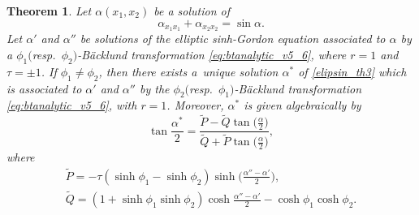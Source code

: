 \documentclass[pdftex]{sigma}
\numberwithin{equation}{section}
\newtheorem{Theorem}{Theorem}[section]
\begin{document}
\begin{Theorem}\label{th:super6}
Let $\alpha(x_1,x_2)$ be a solution of
\begin{equation}\label{elipsin_th3}
\alpha_{x_1x_1}+\alpha_{x_2x_2}=\sin \alpha.
\end{equation}
Let $\alpha'$ and $\alpha''$ be solutions of the elliptic sinh-Gordon
equation associated to $\alpha$ by a $\phi_1($resp.~$\phi_2)$-B\"acklund transformation \eqref{eq:btanalytic_v5_6}, where $r=1$ and $\tau=\pm 1$.
If $\phi_1\neq \phi_2$, then there exists a~unique solution $\alpha^*$ of \eqref{elipsin_th3} which is associated to
$\alpha'$ and $\alpha''$ by the $\phi_2($resp.\ $\phi_1)$-B\"acklund transformation \eqref{eq:btanalytic_v5_6}, with $r=1$. Moreover, $\alpha^*$ is
given algebraically by
\begin{equation}\label{eq:superpos_th3}
\tan \frac{\alpha^*}{2}= \frac{\tilde{P}-\tilde{Q} {\tan \bigl(\frac{\alpha}{2}\bigr) } }{\tilde{Q}+\tilde{P} {\tan\bigl(\frac{\alpha}{2}\bigr)} },
\end{equation}
where
\begin{gather}\label{Pt}
\tilde{P}=-\tau(\sinh \phi_1-\sinh \phi_2) \sinh\biggl(\frac{\alpha''-\alpha'}{2}\biggr),
\\
\label{Qt}
\tilde{Q}=(1+\sinh\phi_1\sinh\phi_2)\cosh\frac{\alpha''-\alpha'}{2}-\cosh\phi_1\cosh\phi_2.
\end{gather}
\end{Theorem}
\end{document}
